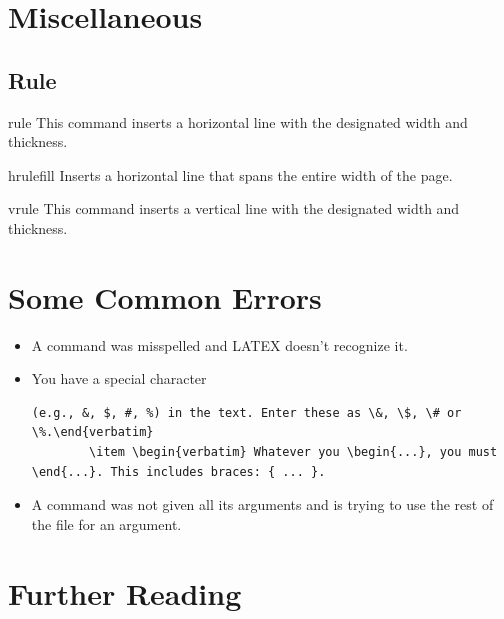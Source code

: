 \documentclass[12pt,hidelinks]{article}
\begin{document}
\section{Miscellaneous}
\vspace{10.5cm}
	\subsection{Rule}
		\begin{docCommand}{rule}{}
				This command inserts a horizontal line with the designated width and thickness.
		\end{docCommand}
		\begin{docCommand}{hrulefill}{}
				Inserts a horizontal line that spans the entire width of the page.
		\end{docCommand}
		\begin{docCommand}{vrule}{}
				This command inserts a vertical line with the designated width and thickness.
		\end{docCommand}
\newpage
\section{Some Common Errors}
\vspace{10.5cm}
	\begin{itemize}
		\item A command was misspelled and LATEX doesn’t recognize it.
		\item You have a special character \begin{verbatim}(e.g., &, $, #, %) in the text. Enter these as \&, \$, \# or \%.\end{verbatim}
		\item \begin{verbatim} Whatever you \begin{...}, you must \end{...}. This includes braces: { ... }.\end{verbatim}
		\item A command was not given all its arguments and is trying to use the rest of the file for an argument.
	\end{itemize}
\newpage
\section{Further Reading}\label{sec:resources}
\vspace{10.5cm}
\end{document}
